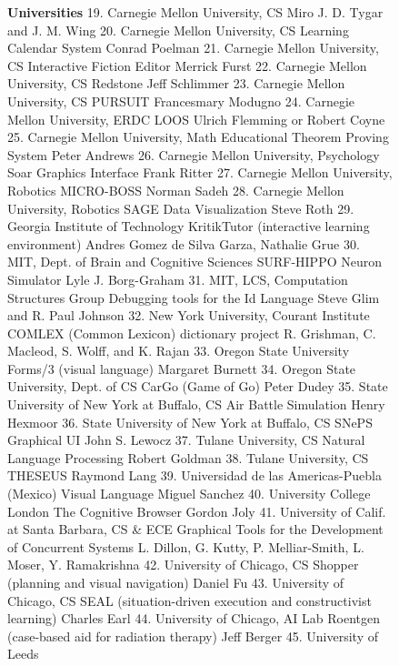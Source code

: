 \begin{figure}
\begin{figcol}
\newcolumn{}
{\bf Universities}
19. Carnegie Mellon University, CS
      Miro
      J. D. Tygar and J. M. Wing
20. Carnegie Mellon University, CS
      Learning Calendar System
      Conrad Poelman
21. Carnegie Mellon University, CS
      Interactive Fiction Editor
      Merrick Furst
22. Carnegie Mellon University, CS
      Redstone
      Jeff Schlimmer
23. Carnegie Mellon University, CS
      PURSUIT
      Francesmary Modugno
24. Carnegie Mellon University, ERDC
      LOOS
      Ulrich Flemming or Robert Coyne
25. Carnegie Mellon University, Math
      Educational Theorem Proving System
      Peter Andrews
26. Carnegie Mellon University, Psychology
      Soar Graphics Interface
      Frank Ritter
27. Carnegie Mellon University, Robotics
      MICRO-BOSS
      Norman Sadeh
28. Carnegie Mellon University, Robotics
      SAGE Data Visualization
      Steve Roth
29. Georgia Institute of Technology
      KritikTutor (interactive learning environment)
      Andres Gomez de Silva Garza, Nathalie Grue
30. MIT, Dept. of Brain and Cognitive Sciences
      SURF-HIPPO Neuron Simulator
      Lyle J. Borg-Graham
31. MIT, LCS, Computation Structures Group
      Debugging tools for the Id Language
      Steve Glim and R. Paul Johnson
32. New York University, Courant Institute
      COMLEX (Common Lexicon) dictionary project
      R. Grishman, C. Macleod, S. Wolff, and K. Rajan
33. Oregon State University
      Forms/3 (visual language)
      Margaret Burnett
34. Oregon State University, Dept. of CS
      CarGo (Game of Go)
      Peter Dudey
35. State University of New York at Buffalo, CS
      Air Battle Simulation
      Henry Hexmoor
36. State University of New York at Buffalo, CS
      SNePS Graphical UI
      John S. Lewocz
37. Tulane University, CS
      Natural Language Processing
      Robert Goldman
38. Tulane University, CS
      THESEUS
      Raymond Lang
\newcolumn{}
39. Universidad de las Americas-Puebla (Mexico)
      Visual Language
      Miguel Sanchez
40. University College London
      The Cognitive Browser
      Gordon Joly
41. University of Calif. at Santa Barbara, CS \& ECE
      Graphical Tools for the Development of
           Concurrent Systems
      L. Dillon, G. Kutty, P. Melliar-Smith,
           L. Moser, Y. Ramakrishna
42. University of Chicago, CS
      Shopper (planning and visual navigation)
      Daniel Fu
43. University of Chicago, CS
      SEAL (situation-driven execution and
           constructivist learning)
      Charles Earl
44. University of Chicago, AI Lab
      Roentgen (case-based aid for radiation therapy)
      Jeff Berger
45. University of Leeds

\end{figcol}
\end{figure}
